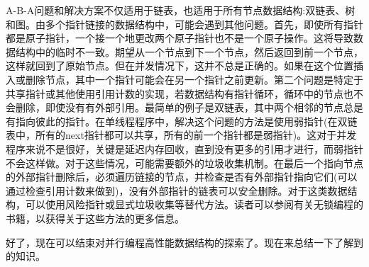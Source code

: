 A-B-A问题和解决方案不仅适用于链表，也适用于所有节点数据结构:双链表、树和图。由多个指针链接的数据结构中，可能会遇到其他问题。首先，即使所有指针都是原子指针，一个接一个地更改两个原子指针也不是一个原子操作。这将导致数据结构中的临时不一致。期望从一个节点到下一个节点，然后返回到前一个节点，这样就回到了原始节点。但在并发情况下，这并不总是正确的。如果在这个位置插入或删除节点，其中一个指针可能会在另一个指针之前更新。第二个问题是特定于共享指针或其他使用引用计数的实现，若数据结构有指针循环，循环中的节点也不会删除，即使没有有外部引用。最简单的例子是双链表，其中两个相邻的节点总是有指向彼此的指针。在单线程程序中，解决这个问题的方法是使用弱指针(在双链表中，所有的next指针都可以共享，所有的前一个指针都是弱指针)。这对于并发程序来说不是很好，关键是延迟内存回收，直到没有更多的引用才进行，而弱指针不会这样做。对于这些情况，可能需要额外的垃圾收集机制。在最后一个指向节点的外部指针删除后，必须遍历链接的节点，并检查是否有外部指针指向它们(可以通过检查引用计数来做到)，没有外部指针的链表可以安全删除。对于这类数据结构，可以使用风险指针或显式垃圾收集等替代方法。读者可以参阅有关无锁编程的书籍，以获得关于这些方法的更多信息。

好了，现在可以结束对并行编程高性能数据结构的探索了。现在来总结一下了解到的知识。













